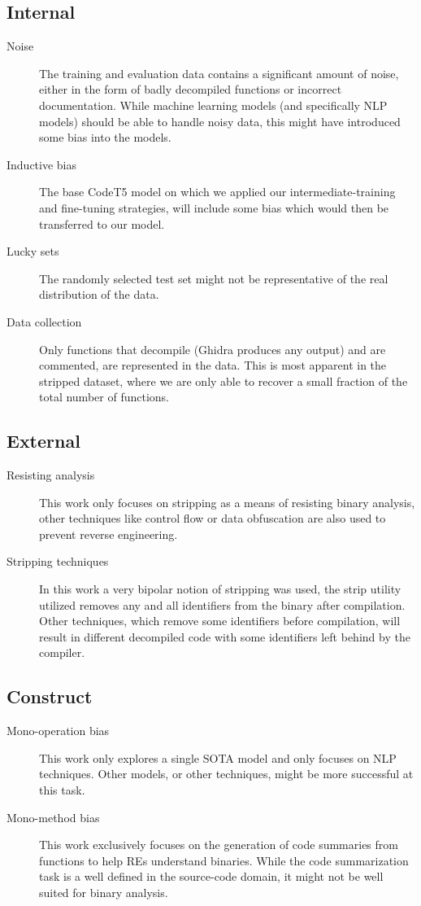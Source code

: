 \subsection{Internal}
    \begin{description}
        \item[Noise] The training and evaluation data contains a significant amount of noise, either in the form of badly decompiled functions or incorrect documentation. While machine learning models (and specifically NLP models) should be able to handle noisy data, this might have introduced some bias into the models.
        \item[Inductive bias] The base CodeT5 model on which we applied our intermediate-training and fine-tuning strategies, will include some bias which would then be transferred to our model.
        \item[Lucky sets] The randomly selected test set might not be representative of the real distribution of the data.
        \item[Data collection] Only functions that decompile (Ghidra produces any output) and are commented, are represented in the data. This is most apparent in the stripped dataset, where we are only able to recover a small fraction of the total number of functions. 
    \end{description}
\subsection{External}
    \begin{description}
        \item[Resisting analysis] This work only focuses on stripping as a means of resisting binary analysis, other techniques like control flow or data obfuscation are also used to prevent reverse engineering. 
        \item[Stripping techniques] In this work a very bipolar notion of stripping was used, the strip utility utilized removes any and all identifiers from the binary after compilation. Other techniques, which remove some identifiers before compilation, will result in different decompiled code with some identifiers left behind by the compiler. 
    \end{description}
\subsection{Construct}
    \begin{description}
        \item[Mono-operation bias] This work only explores a single SOTA model and only focuses on NLP techniques. Other models, or other techniques, might be more successful at this task.
        \item[Mono-method bias] This work exclusively focuses on the generation of code summaries from functions to help REs understand binaries. While the code summarization task is a well defined in the source-code domain, it might not be well suited for binary analysis.
    \end{description}



